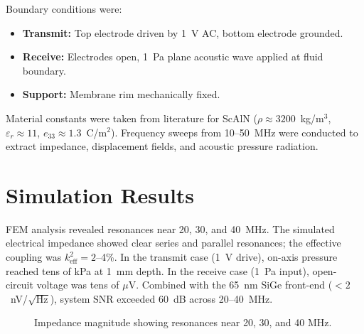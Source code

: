 \documentclass[conference]{IEEEtran}
\begin{document}
Boundary conditions were:
\begin{itemize}
  \item \textbf{Transmit:} Top electrode driven by 1~V AC, bottom electrode grounded.
  \item \textbf{Receive:} Electrodes open, 1~Pa plane acoustic wave applied at fluid boundary.
  \item \textbf{Support:} Membrane rim mechanically fixed.
\end{itemize}

Material constants were taken from literature for ScAlN ($\rho\!\approx\!3200$~kg/m$^3$, $\varepsilon_r\!\approx\!11$, $e_{33}\!\approx\!1.3$~C/m$^2$). Frequency sweeps from 10--50~MHz were conducted to extract impedance, displacement fields, and acoustic pressure radiation.

\section{Simulation Results}
FEM analysis revealed resonances near 20, 30, and 40~MHz. The simulated electrical impedance showed clear series and parallel resonances; the effective coupling was $k^2_{\mathrm{eff}}=2$--4\%. In the transmit case (1~V drive), on-axis pressure reached tens of kPa at 1~mm depth. In the receive case (1~Pa input), open-circuit voltage was tens of $\mu$V. Combined with the 65~nm SiGe front-end ($<2$~nV/$\sqrt{\mathrm{Hz}}$), system SNR exceeded 60~dB across 20--40~MHz.

\begin{figure}[!t]
\centering
{}
\caption{Impedance magnitude showing resonances near 20, 30, and 40 MHz.}
\label{fig:imp}
\end{figure}
\end{document}
